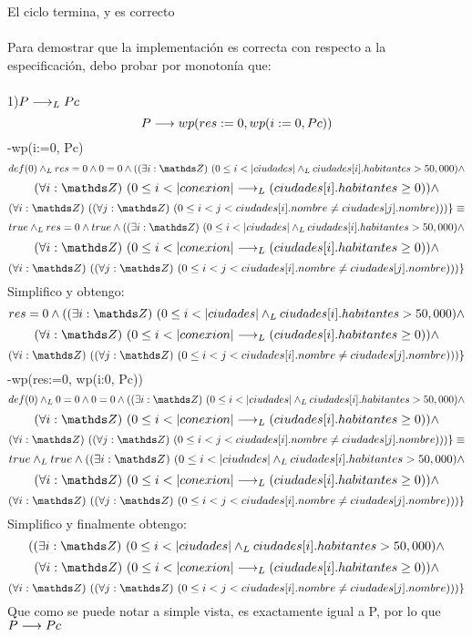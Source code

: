 \documentclass[10pt,a4paper]{article}
\begin{document}
El ciclo termina, y es correcto \\
\\
Para demostrar que la implementación es correcta con respecto a la especificación, debo probar por monotonía que:\\ \\
1)$ P\longrightarrow _L Pc$\\ \hspace{0.5cm}
\[P \longrightarrow wp(res:=0, wp(i:=0, Pc))\]
-wp(i:=0, Pc)
\[def(0) \yLuego  res = 0 \land 0 = 0 \land (\existe[unalinea]i\ent {0\leq i<|ciudades| \yLuego ciudades[i].habitantes > 50,000} \land \]  \[ \paraTodo[unalinea]i{\ent}{0 \leq i<|conexion|  \implicaLuego  (ciudades[i].habitantes \geq 0) } \land \] \[
    \paraTodo[unalinea]i{\ent}{\paraTodo[unalinea]j{\ent}{0 \leq i  < j<ciudades[i].nombre \neq ciudades[j].nombre}})\}  \equiv \]
\[true \yLuego  res = 0 \land true \land (\existe[unalinea]i\ent {0\leq i<|ciudades| \yLuego ciudades[i].habitantes > 50,000} \land \]  \[ \paraTodo[unalinea]i{\ent}{0 \leq i<|conexion|  \implicaLuego  (ciudades[i].habitantes \geq 0) } \land \] \[
    \paraTodo[unalinea]i{\ent}{\paraTodo[unalinea]j{\ent}{0 \leq i  < j<ciudades[i].nombre \neq ciudades[j].nombre}})\}  \]
Simplifico y obtengo:
\[  res = 0  \land (\existe[unalinea]i\ent {0\leq i<|ciudades| \yLuego ciudades[i].habitantes > 50,000} \land \]  \[ \paraTodo[unalinea]i{\ent}{0 \leq i<|conexion|  \implicaLuego  (ciudades[i].habitantes \geq 0) } \land \] \[
    \paraTodo[unalinea]i{\ent}{\paraTodo[unalinea]j{\ent}{0 \leq i  < j<ciudades[i].nombre \neq ciudades[j].nombre}})\}  \]
-wp(res:=0, wp(i:0, Pc))
\[def(0) \yLuego  0 = 0 \land 0 = 0 \land (\existe[unalinea]i\ent {0\leq i<|ciudades| \yLuego ciudades[i].habitantes > 50,000} \land \]  \[ \paraTodo[unalinea]i{\ent}{0 \leq i<|conexion|  \implicaLuego  (ciudades[i].habitantes \geq 0) } \land \] \[
    \paraTodo[unalinea]i{\ent}{\paraTodo[unalinea]j{\ent}{0 \leq i  < j<ciudades[i].nombre \neq ciudades[j].nombre}})\}  \equiv \]
\[true \yLuego  true  \land (\existe[unalinea]i\ent {0\leq i<|ciudades| \yLuego ciudades[i].habitantes > 50,000} \land \]  \[ \paraTodo[unalinea]i{\ent}{0 \leq i<|conexion|  \implicaLuego  (ciudades[i].habitantes \geq 0) } \land \] \[
    \paraTodo[unalinea]i{\ent}{\paraTodo[unalinea]j{\ent}{0 \leq i  < j<ciudades[i].nombre \neq ciudades[j].nombre}})\}  \]
Simplifico y finalmente obtengo:
\[(\existe[unalinea]i\ent {0\leq i<|ciudades| \yLuego ciudades[i].habitantes > 50,000} \land \]  \[ \paraTodo[unalinea]i{\ent}{0 \leq i<|conexion|  \implicaLuego  (ciudades[i].habitantes \geq 0) } \land \] \[
    \paraTodo[unalinea]i{\ent}{\paraTodo[unalinea]j{\ent}{0 \leq i  < j<ciudades[i].nombre \neq ciudades[j].nombre}})\}  \]
Que como se puede notar a simple vista, es exactamente igual a P, por lo que $P \longrightarrow Pc$  \\
\end{document}
